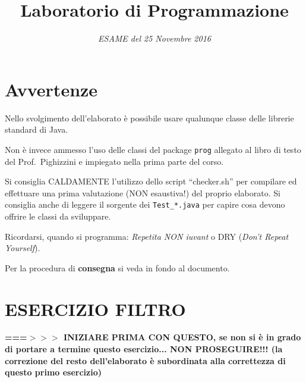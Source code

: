 \documentclass[a4paper,12pt]{article}
\title{Laboratorio di Programmazione}
\date{\textit{ESAME del 25 Novembre 2016}}
\begin{document}
\maketitle

\tableofcontents

\hrulefill

\section*{Avvertenze}

\begin{compactitem}
\item 
Nello svolgimento dell'elaborato è possibile
usare qualunque classe delle librerie standard di Java.

\item Non è invece
ammesso l'uso delle classi del package {\tt prog} allegato al libro di
testo del Prof.~Pighizzini e impiegato nella prima parte del corso.

\item Si consiglia CALDAMENTE l'utilizzo dello script ``checker.sh'' per 
compilare ed effettuare una prima valutazione (NON esaustiva!) del proprio elaborato.
Si consiglia anche di leggere il sorgente dei \texttt{Test\_*.java} per 
capire cosa devono offrire le classi da sviluppare.

\item Ricordarsi, quando si programma: \emph{Repetita NON iuvant} o DRY (\emph{Don't Repeat Yourself}).

\item Per la procedura di \textbf{consegna} si veda in fondo al documento.

\end{compactitem}

\newpage
\hrulefill
\section{ESERCIZIO FILTRO}


\textbf{===$>>>$ INIZIARE PRIMA CON QUESTO,
se non si è in grado di portare a termine questo esercizio...
NON PROSEGUIRE!!!
(la correzione del resto dell'elaborato è subordinata alla correttezza di questo primo esercizio)}
\medskip
\end{document}
